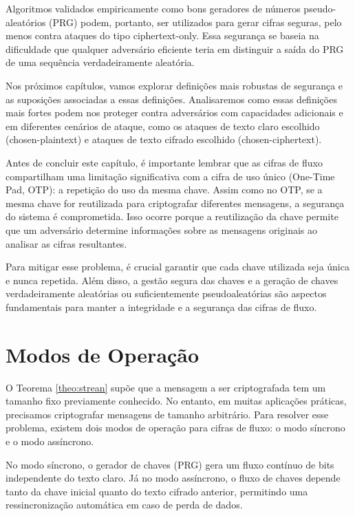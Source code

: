 Algoritmos validados empiricamente como bons geradores de números pseudo-aleatórios (PRG) podem, portanto, ser utilizados para gerar cifras seguras, pelo menos contra ataques do tipo ciphertext-only.
Essa segurança se baseia na dificuldade que qualquer adversário eficiente teria em distinguir a saída do PRG de uma sequência verdadeiramente aleatória.

Nos próximos capítulos, vamos explorar definições mais robustas de segurança e as suposições associadas a essas definições.
Analisaremos como essas definições mais fortes podem nos proteger contra adversários com capacidades adicionais e em diferentes cenários de ataque, como os ataques de texto claro escolhido (chosen-plaintext) e ataques de texto cifrado escolhido (chosen-ciphertext).

Antes de concluir este capítulo, é importante lembrar que as cifras de fluxo compartilham uma limitação significativa com a cifra de uso único (One-Time Pad, OTP):
a repetição do uso da mesma chave.
Assim como no OTP, se a mesma chave for reutilizada para criptografar diferentes mensagens, a segurança do sistema é comprometida.
Isso ocorre porque a reutilização da chave permite que um adversário determine informações sobre as mensagens originais ao analisar as cifras resultantes.

Para mitigar esse problema, é crucial garantir que cada chave utilizada seja única e nunca repetida.
Além disso, a gestão segura das chaves e a geração de chaves verdadeiramente aleatórias ou suficientemente pseudoaleatórias são aspectos fundamentais para manter a integridade e a segurança das cifras de fluxo.

\section{Modos de Operação}
\label{sec:modos-de-operacao}

O Teorema \ref{theo:strean} supõe que a mensagem a ser criptografada tem um tamanho fixo previamente conhecido.
No entanto, em muitas aplicações práticas, precisamos criptografar mensagens de tamanho arbitrário.
Para resolver esse problema, existem dois modos de operação para cifras de fluxo: o modo síncrono e o modo assíncrono.

No modo síncrono, o gerador de chaves (PRG) gera um fluxo contínuo de bits independente do texto claro.
Já no modo assíncrono, o fluxo de chaves depende tanto da chave inicial quanto do texto cifrado anterior, permitindo uma ressincronização automática em caso de perda de dados.

